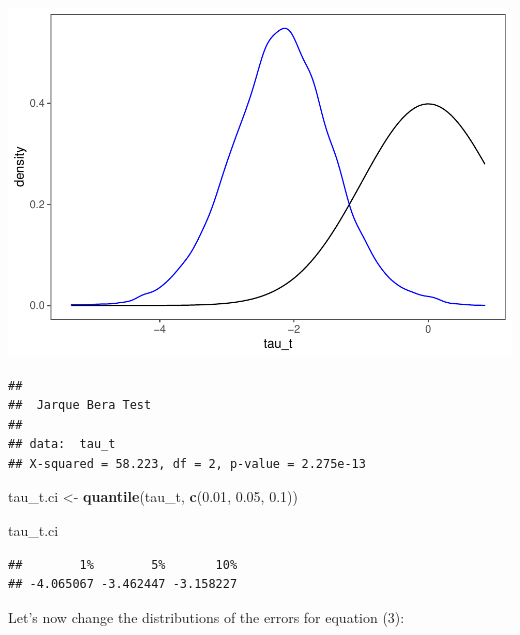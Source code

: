 \documentclass[11pt, a4paper]{report}
\newenvironment{Shaded}{\begin{snugshade}}{\end{snugshade}}
\newcommand{\CommentTok}[1]{\textcolor[rgb]{0.56,0.35,0.01}{\textit{#1}}}
\newcommand{\FloatTok}[1]{\textcolor[rgb]{0.00,0.00,0.81}{#1}}
\newcommand{\KeywordTok}[1]{\textcolor[rgb]{0.13,0.29,0.53}{\textbf{#1}}}
\newcommand{\NormalTok}[1]{#1}
\newcommand{\StringTok}[1]{\textcolor[rgb]{0.31,0.60,0.02}{#1}}
\theoremstyle{plain}
\theoremstyle{plain}
\theoremstyle{remark}
\begin{document}
\begin{center}\includegraphics{Econo2_P6_files/figure-latex/monte carlo 3-1} \end{center}

\begin{Shaded}
\end{Shaded}

\begin{verbatim}
## 
##  Jarque Bera Test
## 
## data:  tau_t
## X-squared = 58.223, df = 2, p-value = 2.275e-13
\end{verbatim}

\begin{Shaded}
\begin{Highlighting}[]
\NormalTok{tau_t.ci <-}\StringTok{ }\KeywordTok{quantile}\NormalTok{(tau_t, }\KeywordTok{c}\NormalTok{(}\FloatTok{0.01}\NormalTok{, }\FloatTok{0.05}\NormalTok{, }\FloatTok{0.1}\NormalTok{))}

\NormalTok{tau_t.ci}
\end{Highlighting}
\end{Shaded}

\begin{verbatim}
##        1%        5%       10% 
## -4.065067 -3.462447 -3.158227
\end{verbatim}

Let's now change the distributions of the errors for equation (3):
\end{document}
